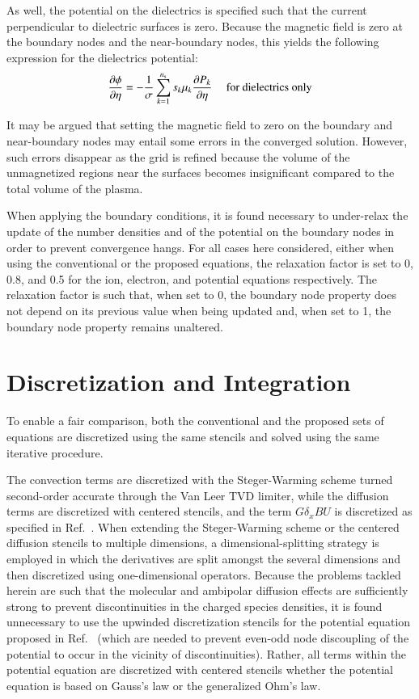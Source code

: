 \documentclass[twoside,onecolumn,10pt]{waflarticle}
\newcommand{\mfd}{\displaystyle}
\newcommand{\ns}{{n_{\rm s}}}
\begin{document}
As well, the potential on the dielectrics is specified such that the current perpendicular to dielectric surfaces is zero. Because the magnetic field is zero at the boundary nodes and the near-boundary nodes, this yields the following expression for the dielectrics potential:  
%
\begin{equation}
\mfd  \frac{\partial \phi}{\partial \eta} =     
             - \frac{1}{\sigma}\sum_{k=1}^\ns s_k \mu_k  \frac{\partial P_k}{\partial \eta}{~~~~~\rm for~dielectrics~only}
\end{equation}
%

It may be argued that setting the magnetic field to zero on the boundary and near-boundary nodes may entail some errors in the converged solution. However, such errors disappear as the grid is refined because the volume of the unmagnetized regions near the surfaces becomes insignificant compared to the total volume of the plasma.

When applying the boundary conditions, it is found necessary to under-relax the update of the number densities and of the potential on the boundary nodes in order to prevent convergence hangs. For all cases here considered, either when using the conventional or the proposed equations, the relaxation factor is set to 0, 0.8, and 0.5 for the ion, electron, and potential equations respectively. The relaxation factor is such that, when set to 0, the boundary node property does not depend on its previous value when being updated and, when set to 1, the boundary node property remains unaltered. 


      
\section{Discretization and Integration}

To enable a fair comparison, both the conventional and the proposed sets of equations are discretized using the same stencils and solved using the same iterative procedure. 

The convection terms are discretized with the Steger-Warming scheme turned second-order accurate through the Van Leer TVD limiter, while the diffusion terms are discretized with centered stencils, and the term $G \delta_x BU$ is discretized as specified in Ref.\ \cite{jcp:2013:parent}. When extending the Steger-Warming scheme or the centered diffusion stencils to multiple dimensions, a dimensional-splitting strategy is employed in which the derivatives are split amongst the several dimensions and then discretized using one-dimensional operators. Because the problems tackled herein are such that the molecular and ambipolar diffusion effects are sufficiently strong to prevent discontinuities in the charged species densities, it is found unnecessary to use the upwinded discretization stencils for the potential equation proposed in Ref.\ \cite{jcp:2011:parent} (which are needed to prevent even-odd node discoupling of the potential to occur in the vicinity of discontinuities). Rather, all terms within the potential equation are discretized with centered stencils whether the potential equation is based on Gauss's law or the generalized Ohm's law.   
\end{document}
